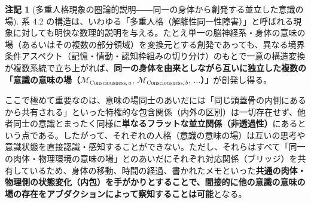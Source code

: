 \documentclass[11pt,a4paper]{ltjsarticle}
\theoremstyle{definition}
\newtheorem{remark}{注記}[section]
\theoremstyle{plain}
\begin{document}
\begin{remark}[多重人格現象の圏論的説明――同一の身体から創発する並立した意識の場]
系 4.2 の構造は、いわゆる「多重人格（解離性同一性障害）」と呼ばれる現象に対しても明快な数理的説明を与える。たとえ単一の脳神経系・身体の意味の場（あるいはその複数の部分領域）を変換元とする創発であっても、異なる境界条件アスペクト（記憶・情動・認知枠組みの切り分け）のもとで一意の構造変換が複数系統で立ち上がれば、\textbf{同一の身体を由来としながら互いに独立した複数の「意識の意味の場（$\mathcal{M}_{\mathrm{Consciousness}, a},\, \mathcal{M}_{\mathrm{Consciousness}, b},\, \dots$）」}が創発し得る。

ここで極めて重要なのは、意味の場同士のあいだには「同じ頭蓋骨の内側にあるから共有される」といった特権的な包含関係（内外の区別）は一切存在せず、他者同士の意識とまったく同様に\textbf{単なるフラットな並立関係（非透過性）}にあるという点である。したがって、それぞれの人格（意識の意味の場）は互いの思考や意識状態を直接認識・感知することができない。ただし、それらはすべて「同一の肉体・物理環境の意味の場」とのあいだにそれぞれ対応関係（ブリッジ）を共有しているため、身体の移動、時間の経過、書かれたメモといった\textbf{共通の肉体・物理側の状態変化（内包）を手がかりとすることで、間接的に他の意識の意味の場の存在をアブダクションによって察知することは可能}となる。
\end{remark}
\end{document}
